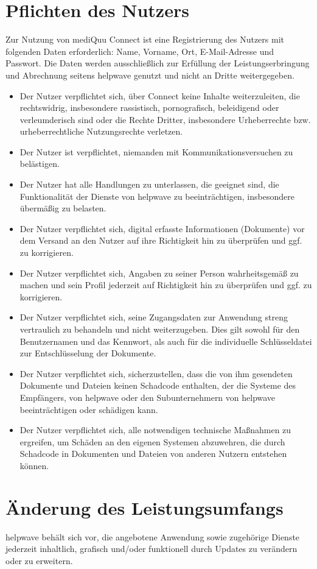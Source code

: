 \documentclass[10pt]{article}
\begin{document}
\section{Pflichten des Nutzers}
Zur Nutzung von mediQuu Connect ist eine Registrierung des Nutzers mit folgenden Daten erforderlich: Name, Vorname, Ort, E-Mail-Adresse und Passwort. Die Daten werden ausschließlich zur Erfüllung der Leistungserbringung und Abrechnung seitens helpwave genutzt und nicht an Dritte weitergegeben.
\begin{itemize}
	\item Der Nutzer verpflichtet sich, über Connect keine Inhalte weiterzuleiten, die rechtswidrig, insbesondere rassistisch, pornografisch, beleidigend oder verleumderisch sind oder die Rechte Dritter, insbesondere Urheberrechte bzw. urheberrechtliche Nutzungsrechte verletzen.
	\item Der Nutzer ist verpflichtet, niemanden mit Kommunikationsversuchen zu belästigen.
	\item Der Nutzer hat alle Handlungen zu unterlassen, die geeignet sind, die Funktionalität der Dienste von helpwave zu beeinträchtigen, insbesondere übermäßig zu belasten.
	\item Der Nutzer verpflichtet sich, digital erfasste Informationen (Dokumente) vor dem Versand an den Nutzer auf ihre Richtigkeit hin zu überprüfen und ggf. zu korrigieren.
	\item Der Nutzer verpflichtet sich, Angaben zu seiner Person wahrheitsgemäß zu machen und sein Profil jederzeit auf Richtigkeit hin zu überprüfen und ggf. zu korrigieren.
	\item Der Nutzer verpflichtet sich, seine Zugangsdaten zur Anwendung streng vertraulich zu behandeln und nicht weiterzugeben. Dies gilt sowohl für den Benutzernamen und das Kennwort, als auch für die individuelle Schlüsseldatei zur Entschlüsselung der Dokumente.
	\item Der Nutzer verpflichtet sich, sicherzustellen, dass die von ihm gesendeten Dokumente und Dateien keinen Schadcode enthalten, der die Systeme des Empfängers, von helpwave oder den Subunternehmern von helpwave beeinträchtigen oder schädigen kann.
	\item Der Nutzer verpflichtet sich, alle notwendigen technische Maßnahmen zu ergreifen, um Schäden an den eigenen Systemen abzuwehren, die durch Schadcode in Dokumenten und Dateien von anderen Nutzern entstehen können.
\end{itemize}

\section{Änderung des Leistungsumfangs}
helpwave behält sich vor, die angebotene Anwendung sowie zugehörige Dienste jederzeit inhaltlich, grafisch und/oder funktionell durch Updates zu verändern oder zu erweitern.
\end{document}
